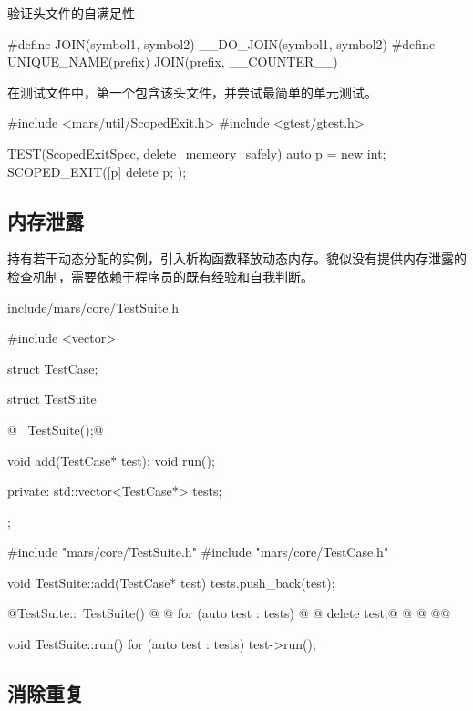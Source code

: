 \begin{content}
\begin{episode}{验证头文件的自满足性}
\begin{content}
\begin{c++}[title={\ttfamily{实用宏：include/mars/util/Symbol.h}}]
#define JOIN(symbol1, symbol2) __DO_JOIN(symbol1, symbol2)
#define UNIQUE_NAME(prefix) JOIN(prefix, __COUNTER__)
\end{c++}

在测试文件中，第一个包含该头文件，并尝试最简单的单元测试。

\begin{c++}[title={\ttfamily{测试ScopedExit：test/mars/util/ScopedExitSpec.cc}}]
#include <mars/util/ScopedExit.h>
#include <gtest/gtest.h>

TEST(ScopedExitSpec, delete_memeory_safely) {
  auto p = new int;
  SCOPED_EXIT([p] {
    delete p;
  });
}
\end{c++}

\end{content}
\end{episode}

\subsection{内存泄露}

持有若干动态分配的实例，引入析构函数释放动态内存。貌似没有提供内存泄露的检查机制，需要依赖于程序员的既有经验和自我判断。

\begin{diff}{include/mars/core/TestSuite.h}
 \begin{minicpp}
#include <vector>

struct TestCase;

struct TestSuite {
@  ~TestSuite();@

  void add(TestCase* test);
  void run();

private:
  std::vector<TestCase*> tests;
}; \end{minicpp}
\tcblower
 \begin{minicpp}
#include "mars/core/TestSuite.h"
#include "mars/core/TestCase.h"

void TestSuite::add(TestCase* test) {
  tests.push_back(test);
}

@TestSuite::~TestSuite() {@
@  for (auto test : tests) {@
@    delete test;@
@  }@
@}@

void TestSuite::run() {
  for (auto test : tests) {
    test->run();
  }
}
 \end{minicpp}
\end{diff}

\subsection{消除重复}


\end{content}
